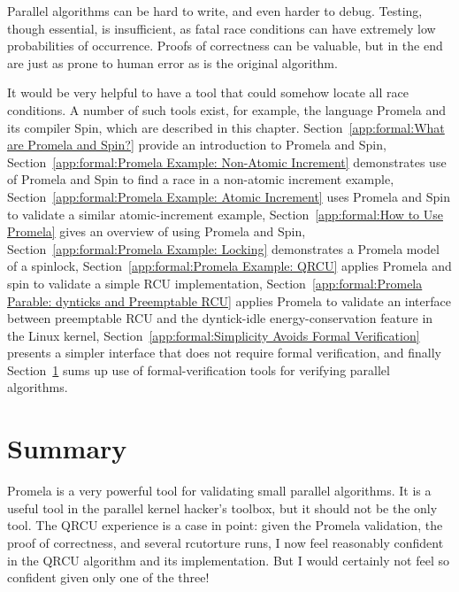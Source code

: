 


Parallel algorithms can be hard to write, and even harder to debug.
Testing, though essential, is insufficient, as fatal race conditions
can have extremely low probabilities of occurrence.
Proofs of correctness can be valuable, but in the end are just as
prone to human error as is the original algorithm.

It would be very helpful to have a tool that could somehow locate
all race conditions.
A number of such tools exist, for example,
the language Promela and its compiler Spin, which are described in
this chapter.
Section~\ref{app:formal:What are Promela and Spin?} provide an
introduction to Promela and Spin,
Section~\ref{app:formal:Promela Example: Non-Atomic Increment}
demonstrates use of Promela and Spin to find a race in a non-atomic increment
example,
Section~\ref{app:formal:Promela Example: Atomic Increment}
uses Promela and Spin to validate a similar atomic-increment example,
Section~\ref{app:formal:How to Use Promela}
gives an overview of using Promela and Spin,
Section~\ref{app:formal:Promela Example: Locking}
demonstrates a Promela model of a spinlock,
Section~\ref{app:formal:Promela Example: QRCU}
applies Promela and spin to validate a simple RCU implementation,
Section~\ref{app:formal:Promela Parable: dynticks and Preemptable RCU}
applies Promela to validate an interface between preemptable RCU and
the dyntick-idle energy-conservation feature in the Linux kernel,
Section~\ref{app:formal:Simplicity Avoids Formal Verification}
presents a simpler interface that does not require formal verification,
and finally
Section~\ref{app:formal:Summary}
sums up use of formal-verification tools for verifying parallel algorithms.




\section{Summary}
\label{app:formal:Summary}

Promela is a very powerful tool for validating small parallel algorithms.
It is a useful tool in the parallel kernel hacker's toolbox, but
it should not be the only tool.
The QRCU experience is a case in point: given the Promela validation,
the proof of correctness, and several
rcutorture
runs, I now feel
reasonably confident in the QRCU algorithm and its implementation.
But I would certainly not feel so confident given only one of the three!

